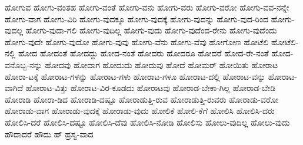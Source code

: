 {ಹೋಗುವ
ಹೋಗು-ವಂತಹ
ಹೋಗು-ವಂತೆ
ಹೋಗು-ವನು
ಹೋಗು-ವರು
ಹೋಗು-ವರೋ
ಹೋಗು-ವವ-ನನ್ನೇ
ಹೋಗು-ವಾಗ
ಹೋಗು-ವಿರಿ
ಹೋಗು-ವುದಕ್ಕೂ
ಹೋಗು-ವುದಕ್ಕೆ
ಹೋಗು-ವುದನ್ನು
ಹೋಗು-ವುದ-ರಿಂದ
ಹೋಗು-ವುದಲ್ಲ
ಹೋಗು-ವುದಾ-ಗಲಿ
ಹೋಗು-ವುದಿಲ್ಲ
ಹೋಗು-ವುದು
ಹೋಗು-ವುದೆಂದ-ರೇನು
ಹೋಗು-ವುದೆಂದು
ಹೋಗು-ವುದೇ
ಹೋಗು-ವುದೋ
ಹೋಗು-ವುವು
ಹೋಗು-ವೆನು
ಹೋಗು-ವೆವು
ಹೋಗೋಣ
ಹೋಟೆಲಿ
ಹೋಟೆಲಿ-ನಲ್ಲಿ
ಹೋದ
ಹೋದಂತೆ
ಹೋದದ್ದು
ಹೋದ-ನಂತೆ
ಹೋದರು
ಹೋದರೂ
ಹೋದರೆ
ಹೋದ-ರೇ-ನಂತೆ
ಹೋದ-ವನೊಬ್ಬ-ನನ್ನು
ಹೋದವು
ಹೋದಾಗ
ಹೋದುದು
ಹೋದುವು
ಹೋದೆ
ಹೋಮರ್
ಹೋಯಿತು
ಹೋರಾಟ
ಹೋರಾ-ಟಕ್ಕೆ
ಹೋರಾಟ-ಗಳನ್ನು
ಹೋರಾಟ-ಗಳು
ಹೋರಾಟ-ಗಳೂ
ಹೋರಾಟ-ದಲ್ಲಿ
ಹೋರಾಟ-ವನ್ನು
ಹೋರಾಟ-ವಾಗಿದೆ
ಹೋರಾಟ-ವಿತ್ತು
ಹೋರಾಟ-ವಿರ-ಕೂಡದು
ಹೋರಾಟವು
ಹೋರಾಡ-ಬೇಕಾ-ಗಿಲ್ಲ
ಹೋರಾಡ-ಬೇಡಿ
ಹೋರಾಡಿ
ಹೋರಾ-ಡಿದ
ಹೋರಾಡಿ-ದಷ್ಟೂ
ಹೋರಾಡುತ್ತಿ-ರುವ
ಹೋರಾಡುತ್ತಿ-ರುವರು
ಹೋರಾಡು-ವರೋ
ಹೋರಾಡು-ವಾಗ
ಹೋರಾಡು-ವುದಕ್ಕೆ
ಹೋರಾಡು-ವುದು
ಹೋಲಿಕೆ
ಹೋಲಿ-ಕೆಗೆ
ಹೋಲಿಸಿ
ಹೋಲಿಸಿ-ದರು
ಹೋಲಿಸಿ-ದರೆ
ಹೋಲಿಸಿ-ದಷ್ಟೂ
ಹೋಲಿಸಿ-ದೆವು
ಹೋಲಿಸಿ-ನೋಡಿ
ಹೋಲಿಸು
ಹೋಲು-ವುದಿಲ್ಲ
ಹೋಲು-ವುದು
ಹೌದಾದರೆ
ಹೌದು
ಹ್
ಹ್ರಸ್ವ-ವಾದ
}
